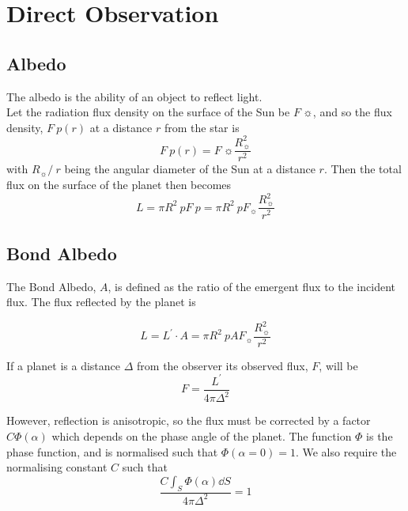 \documentclass{momento}
\begin{document}
\section{Direct Observation}
\label{sec:direct-observation}

\subsection{Albedo}
\label{sec:albedo}

The albedo is the ability of an object to reflect light. \\
Let the radiation flux density on the surface of the Sun be $F~\sun$,
and so the flux density, $F~p(r)$ at a distance $r$ from the star is
\begin{equation}
  \label{eq:1}
  F~p(r) = F~\sun \frac{R^2_{\sun}}{r^2}
\end{equation}
with $R_{\sun} /\ r$ being the angular diameter of the Sun at a
distance $r$. Then the total flux on the surface of the planet then becomes 
\[ L = \pi R^2~p F~p = \pi R^2~p F_{\sun} \frac{R^2_{\sun}}{r^2} \]

\subsection{Bond Albedo}
\label{sec:bond-albedo}

The Bond Albedo, $A$, is defined as the ratio of the emergent flux to
the incident flux. The flux reflected by the planet is

\begin{equation}
  \label{eq:2}
  L = L^{\prime} \cdot A =  \pi R^2~p A F_{\sun} \frac{R^2_{\sun}}{r^2}
\end{equation}

If a planet is a distance $\Delta$ from the observer its observed
flux, $F$, will be
\begin{equation}
  \label{eq:3}
  F = \frac{L^{\prime}}{4 \pi \Delta^2}
\end{equation}

However, reflection is anisotropic, so the flux must be corrected by a
factor $C \Phi(\alpha)$ which depends on the phase angle of the
planet. The function $\Phi$ is the phase function, and is normalised
such that $\Phi(\alpha = 0) = 1$. We also require the normalising
constant $C$ such that
\begin{equation}
  \label{eq:4}
  \frac{ C \int_S \Phi(\alpha) \dd{S}}{4 \pi \Delta^2} = 1
\end{equation}
\end{document}
